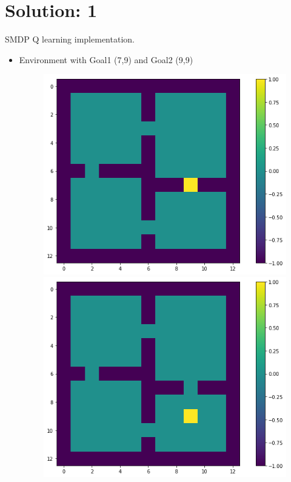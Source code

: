 \documentclass[a4paper]{article}
\begin{document}
\section*{Solution: 1}
SMDP Q learning implementation.
\begin{itemize}
\item Environment with Goal1 (7,9) and Goal2 (9,9)
\begin{figure}[htbp!]
\centering
\begin{minipage}{.5\textwidth}
  \centering
  \includegraphics[width=1\linewidth]{env1.png}
\end{minipage}%
\begin{minipage}{.5\textwidth}
  \centering
  \includegraphics[width=1\linewidth]{env2.png}
\end{minipage}
\end{figure}


\end{itemize}
\end{document}
